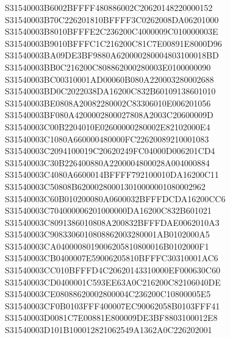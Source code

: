 \documentclass[12pt,a4paper]{article}
\begin{document}
\begin{framed}
{S31540003B6002BFFFF480886002C20620148220000152\newline
S31540003B70C226201810BFFFF3C0262008DA06201000\newline
S31540003B8010BFFFE2C236200C4000009C010000003E\newline
S31540003B9010BFFFC1C216200C81C7E00891E8000D96\newline
S31540003BA09DE3BF9880A620000280004803100018BD\newline
S31540003BB0C216200C808862000280003E0100000090\newline
S31540003BC00310001AD00060B080A220003280002688\newline
S31540003BD0C2022038DA16200C832B60109138601010\newline
S31540003BE0808A20082280002C83306010E006201056\newline
S31540003BF080A4200002800027808A2003C20600009D\newline
S31540003C00B2204010E02600000280002E82102000E4\newline
S31540003C1080A660000480000FC22620089210001083\newline
S31540003C2094100019C20620249FC04000D006201CD4\newline
S31540003C30B226400880A2200004800028A004000884\newline
S31540003C4080A6600014BFFFF792100010DA16200C11\newline
S31540003C50808B620002800013010000001080002962\newline
S31540003C60B010200080A0600032BFFFDCDA16200CC6\newline
S31540003C704000006201000000DA16200C832B601021\newline
S31540003C8091386010808A200832BFFFDAE0062010A3\newline
S31540003C9083306010808862003280001AB0102000A5\newline
S31540003CA0400008019006205810800016B0102000F1\newline
S31540003CB0400007E59006205810BFFFC30310001AC6\newline
S31540003CC010BFFFD4C20620143310000EF000630C60\newline
S31540003CD0400001C593EE63A0C216200C82106040DE\newline
S31540003CE08088620002800004C236200C10800005E5\newline
S31540003CF0B0103FFF400007EC90062058B0103FFF41\newline
S31540003D0081C7E00881E800009DE3BF8803100012E8\newline
S31540003D101B100012821062549A1362A0C226202001\newline
}
\end{framed}
\end{document}
